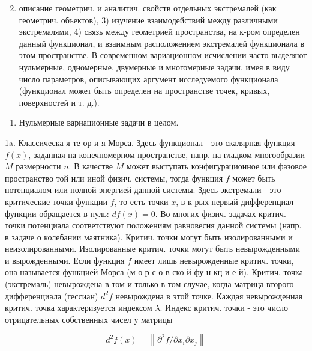 \documentclass[10pt]{article}
\begin{document}
\begin{enumerate}

  \setcounter{enumi}{1}

  \item описание геометрич. и аналитич. свойств отдельных экстремалей (как геометрич. объектов), 3) изучение взаимодействий между различными экстремалями, 4) связь между геометрией пространства, на к-ром определен данный функционал, и взаимным расположением экстремалей функционала в этом пространстве. В современном вариационном исчислении часто выделяют нульмерные, одномерные, двумерные и многомерные задачи, имея в виду число параметров, описывающих аргумент исследуемого функционала (функционал может быть определен на пространстве точек, кривых, поверхностей и т. д.).

\end{enumerate}



\begin{enumerate}

  \item Нульмерные вариационные задачи в целом.

\end{enumerate}



1a. Классическа я те ор и я Морса. Здесь функционал - это скалярная функция $f(x)$, заданная на конечномерном пространстве, напр. на гладком многообразии $M$ размерности $n$. В качестве $M$ может выступать конфигурационное или фазовое пространство той или иной физич. системы, тогда функция $f$ может быть потенциалом или полной энергией данной системы. Здесь экстремали - это критические точки функции $f$, то есть точки $x$, в к-рых первый дифференциал функции обращается в нуль: $d f(x)=0$. Во многих физич. задачах критич. точки потенциала соответствуют положениям равновесия данной системы (напр. в задаче о колебании маятника). Критич. точки могут быть изолированными и неизолированными. Изолированные критич. точки могут быть невырожденными и вырожденными. Если функция $f$ имеет лишь невырожденные критич. точки, она называется функцией Морса (м о р с о в ско й фу н кц и е й). Критич. точка (экстремаль) невырождена в том и только в том случае, когда матрица второго дифференциала (гессиан) $d^{2} f$ невырождена в этой точке. Каждая невырожденная критич. точка характеризуется индексом $\lambda$. Индекс критич. точки - это число отрицательных собственных чисел у матрицы



\[

d^{2} f(x)=\left\|\partial^{2} f / \partial x_{i} \partial x_{j}\right\|

\]
\end{document}
